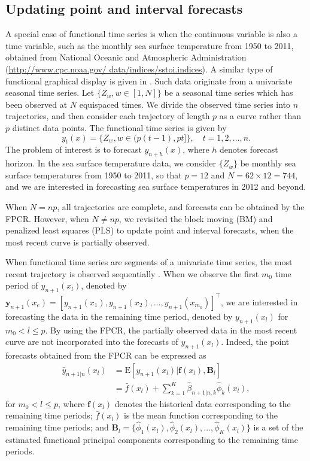 \documentclass[nojss]{jss}
\begin{document}
\subsection*{Updating point and interval forecasts}

A special case of functional time series is when the continuous variable is also a time variable, such as the monthly sea surface temperature from 1950 to 2011, obtained from National Oceanic and Atmospheric Administration (\url{http://www.cpc.noaa.gov/ data/indices/sstoi.indices}). A similar type of functional graphical display is given in \citet[][Figure 2]{Shang11}. Such data originate from a univariate seasonal time series. Let $\{Z_w, w\in[1,N]\}$ be a seasonal time series which has been observed at $N$ equispaced times. We divide the observed time series into $n$ trajectories, and then consider each trajectory of length $p$ as a curve rather than $p$ distinct data points. The functional time series is given by
\begin{equation*}
  y_t(x)=\{Z_w, w\in(p(t-1), pt]\},\quad t=1,2,\dots,n.
\end{equation*}
The problem of interest is to forecast $y_{n+h}(x)$, where $h$ denotes forecast horizon. In the sea surface temperature data, we consider $\{Z_w\}$ be monthly sea surface temperatures from 1950 to 2011, so that $p=12$ and $N=62\times 12=744$, and we are interested in forecasting sea surface temperatures in 2012 and beyond.

When $N=np$, all trajectories are complete, and forecasts can be obtained by the FPCR. However, when $N\neq np$, we revisited the block moving (BM) and penalized least squares (PLS) to update point and interval forecasts, when the most recent curve is partially observed.

When functional time series are segments of a univariate time series, the most recent trajectory is observed sequentially \citep{HS10}. When we observe the first $m_0$ time period of $y_{n+1}(x_l)$, denoted by $\bm{y}_{n+1}(x_e)=[y_{n+1}(x_1),y_{n+1}(x_2),\dots,y_{n+1}(x_{m_0})]^{\top}$, we are interested in forecasting the data in the remaining time period, denoted by $y_{n+1}(x_l)$ for $m_0<l\leq p$. By using the FPCR, the partially observed data in the most recent curve are not incorporated into the forecasts of $y_{n+1}(x_l)$. Indeed, the point forecasts obtained from the FPCR can be expressed as
\begin{align*}
  \hat{y}_{n+1|n}(x_l)&=\text{E}[y_{n+1}(x_l)|\bm{f}(x_l),\mathcal{\bm{B}}_l]\\
  &=\bar{f}(x_l)+\sum^K_{k=1}\hat{\beta}_{n+1|n,k}\hat{\phi}_k(x_l),
\end{align*}
for $m_0<l\leq p$, where $\bm{f}(x_l)$ denotes the historical data corresponding to the remaining time periods; $\bar{f}(x_l)$ is the mean function corresponding to the remaining time periods; and $\mathcal{\bm{B}}_l=\{\hat{\phi}_1(x_l),\hat{\phi}_2(x_l),\dots,\hat{\phi}_K(x_l)\}$ is a set of the estimated functional principal components corresponding to the remaining time periods.
\end{document}
